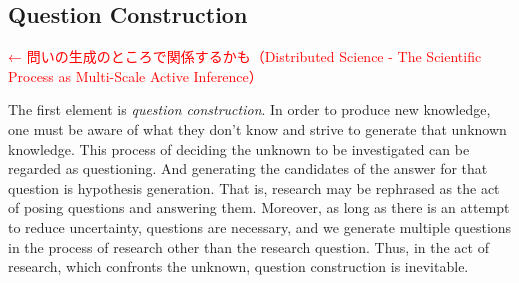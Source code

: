 




\subsection{Question Construction}
\label{section-question-construction}

\textcolor{red}{← 問いの生成のところで関係するかも（Distributed Science - The Scientific Process as Multi-Scale Active Inference）}

The first element is \textit{question construction}. In order to produce new knowledge, one must be aware of what they don't know and strive to generate that unknown knowledge. This process of deciding the unknown to be investigated can be regarded as questioning. And generating the candidates of the answer for that question is hypothesis generation. That is, research may be rephrased as the act of posing questions and answering them. Moreover, as long as there is an attempt to reduce uncertainty, questions are necessary, and we generate multiple questions in the process of research other than the research question. Thus, in the act of research, which confronts the unknown, question construction is inevitable.

